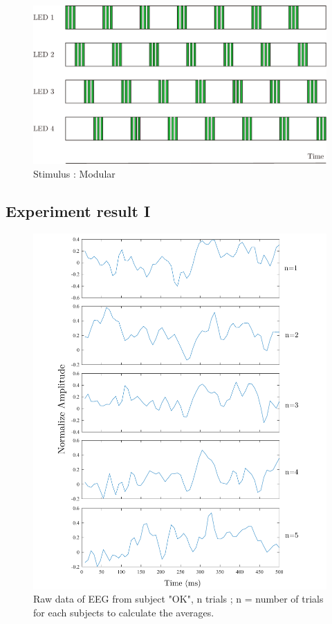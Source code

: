 \begin{figure}[ht]
	\centering
	\includegraphics[scale = 0.65]{chapter7/mod_nor.pdf}
	\caption{Stimulus : Modular}
	\label{fig:mod}
\end{figure}

\newpage
\subsection{Experiment result I}

\begin{figure}[ht]
	\centering
	\includegraphics[scale = 0.4]{chapter7/rawdata.pdf}
	\caption{Raw data of EEG from subject "OK", n trials ; n = number of trials for each subjects to calculate the averages.}
		\label{fig:raw_data}
\end{figure}


